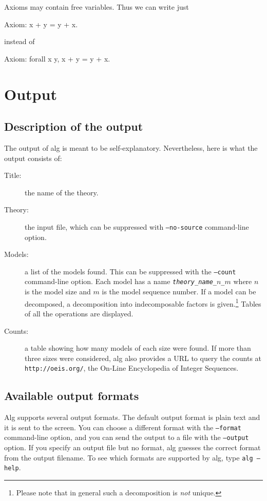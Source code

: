 \documentclass{report}
\begin{document}
Axioms may contain free variables. Thus we can write just
%
\begin{alg}
Axiom: x + y = y + x.
\end{alg}
%
instead of
\begin{alg}
Axiom: forall x y, x + y = y + x.
\end{alg}
%

\chapter{Output}
\label{sec:output-files}

\section{Description of the output}
\label{sec:description-output}

The output of alg is meant to be self-explanatory. Nevertheless, here
is what the output consists of:
%
\begin{description}
\item[Title:] the name of the theory.
\item[Theory:] the input file, which can be suppressed with %
  \texttt{--no-source} command-line option.
\item[Models:] a list of the models found. This can be
  suppressed with the \texttt{--count} command-line option. Each model
  has a name \texttt{\textit{theory\_name\_$n$\_$m$}}
  where $n$ is the model size and $m$ is the model sequence number. If
  a model can be decomposed, a decomposition into indecomposable
  factors is given.\footnote{Please note that in general such a
    decomposition is \emph{not} unique.} Tables of all the operations
  are displayed.
\item[Counts:] a table showing how many models of each size were found.
  If more than three sizes were considered, alg also provides a URL to
  query the counts at \texttt{http://oeis.org/}, the On-Line
  Encyclopedia of Integer Sequences.
\end{description}

\section{Available output formats}
\label{sec:output-formats}

Alg supports several output formats. The default output format is
plain text and it is sent to the screen. You can choose a different
format with the \texttt{--format} command-line option, and you can
send the output to a file with the \texttt{--output} option. If you
specify an output file but no format, alg guesses the correct format
from the output filename. To see which formats are supported by alg,
type \texttt{alg --help}.
\end{document}
